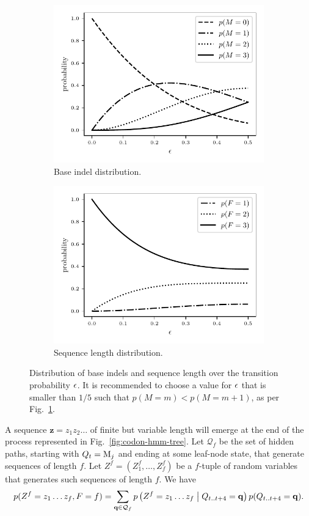 \begin{figure}[htbp]
\centering
\begin{subfigure}{.5\textwidth}
  \centering
  \includegraphics[width=.7\linewidth]{figure/indel-prob}
  \caption{Base indel distribution.}%
  \label{fig:indel-dist}
\end{subfigure}%
\begin{subfigure}{.5\textwidth}
  \centering
  \includegraphics[width=.7\linewidth]{figure/seq-len-prob}
  \caption{Sequence length distribution.}%
  \label{fig:len-dist}
\end{subfigure}
\caption{
    Distribution of base indels and sequence length over the transition probability $\epsilon$.
    It is recommended to choose a value for $\epsilon$ that is smaller than $1/5$ such that
    $p(M=m)<p(M=m+1)$, as per Fig.~\ref{fig:indel-dist}.
}\label{fig:dist}
\end{figure}

A sequence $\mathbf z=z_1 z_2\dots$ of finite but variable length will emerge at the end of the
process represented in Fig.~\ref{fig:codon-hmm-tree}.
Let $\mathcal Q_f$ be the set of hidden paths, starting with $Q_t=\mathrm{M}_j$ and ending at some leaf-node state,
that generate sequences of length $f$.
Let $Z^f=(Z^f_1, \dots, Z^f_f)$ be a $f$-tuple of random variables that generates such sequences of length $f$.
We have
\begin{equation*}
  p(Z^f=z_1\dots z_f,F=f) = \sum_{\mathbf q \in \mathcal Q_f}
  p\left(Z^f=z_1\dots z_f\;\middle|\; Q_{t..t+4}=\mathbf q\right) p(Q_{t..t+4}=\mathbf q).
\end{equation*}
